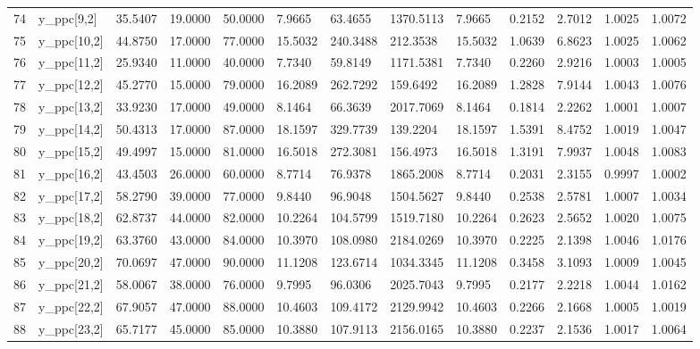 \begin{table}[ht]
\begin{tabular}{rllllllllllll}
  74 & y\_ppc[9,2] &  35.5407 &   19.0000 &  50.0000 &   7.9665 &    63.4655 & 1370.5113 &   7.9665 &  0.2152 &  2.7012 & 1.0025 &  1.0072 \\ 
  75 & y\_ppc[10,2] &  44.8750 &   17.0000 &  77.0000 &  15.5032 &   240.3488 &  212.3538 &  15.5032 &  1.0639 &  6.8623 & 1.0025 &  1.0062 \\ 
  76 & y\_ppc[11,2] &  25.9340 &   11.0000 &  40.0000 &   7.7340 &    59.8149 & 1171.5381 &   7.7340 &  0.2260 &  2.9216 & 1.0003 &  1.0005 \\ 
  77 & y\_ppc[12,2] &  45.2770 &   15.0000 &  79.0000 &  16.2089 &   262.7292 &  159.6492 &  16.2089 &  1.2828 &  7.9144 & 1.0043 &  1.0076 \\ 
  78 & y\_ppc[13,2] &  33.9230 &   17.0000 &  49.0000 &   8.1464 &    66.3639 & 2017.7069 &   8.1464 &  0.1814 &  2.2262 & 1.0001 &  1.0007 \\ 
  79 & y\_ppc[14,2] &  50.4313 &   17.0000 &  87.0000 &  18.1597 &   329.7739 &  139.2204 &  18.1597 &  1.5391 &  8.4752 & 1.0019 &  1.0047 \\ 
  80 & y\_ppc[15,2] &  49.4997 &   15.0000 &  81.0000 &  16.5018 &   272.3081 &  156.4973 &  16.5018 &  1.3191 &  7.9937 & 1.0048 &  1.0083 \\ 
  81 & y\_ppc[16,2] &  43.4503 &   26.0000 &  60.0000 &   8.7714 &    76.9378 & 1865.2008 &   8.7714 &  0.2031 &  2.3155 & 0.9997 &  1.0002 \\ 
  82 & y\_ppc[17,2] &  58.2790 &   39.0000 &  77.0000 &   9.8440 &    96.9048 & 1504.5627 &   9.8440 &  0.2538 &  2.5781 & 1.0007 &  1.0034 \\ 
  83 & y\_ppc[18,2] &  62.8737 &   44.0000 &  82.0000 &  10.2264 &   104.5799 & 1519.7180 &  10.2264 &  0.2623 &  2.5652 & 1.0020 &  1.0075 \\ 
  84 & y\_ppc[19,2] &  63.3760 &   43.0000 &  84.0000 &  10.3970 &   108.0980 & 2184.0269 &  10.3970 &  0.2225 &  2.1398 & 1.0046 &  1.0176 \\ 
  85 & y\_ppc[20,2] &  70.0697 &   47.0000 &  90.0000 &  11.1208 &   123.6714 & 1034.3345 &  11.1208 &  0.3458 &  3.1093 & 1.0009 &  1.0045 \\ 
  86 & y\_ppc[21,2] &  58.0067 &   38.0000 &  76.0000 &   9.7995 &    96.0306 & 2025.7043 &   9.7995 &  0.2177 &  2.2218 & 1.0044 &  1.0162 \\ 
  87 & y\_ppc[22,2] &  67.9057 &   47.0000 &  88.0000 &  10.4603 &   109.4172 & 2129.9942 &  10.4603 &  0.2266 &  2.1668 & 1.0005 &  1.0019 \\ 
  88 & y\_ppc[23,2] &  65.7177 &   45.0000 &  85.0000 &  10.3880 &   107.9113 & 2156.0165 &  10.3880 &  0.2237 &  2.1536 & 1.0017 &  1.0064 \\ 

\end{tabular}
\end{table}
